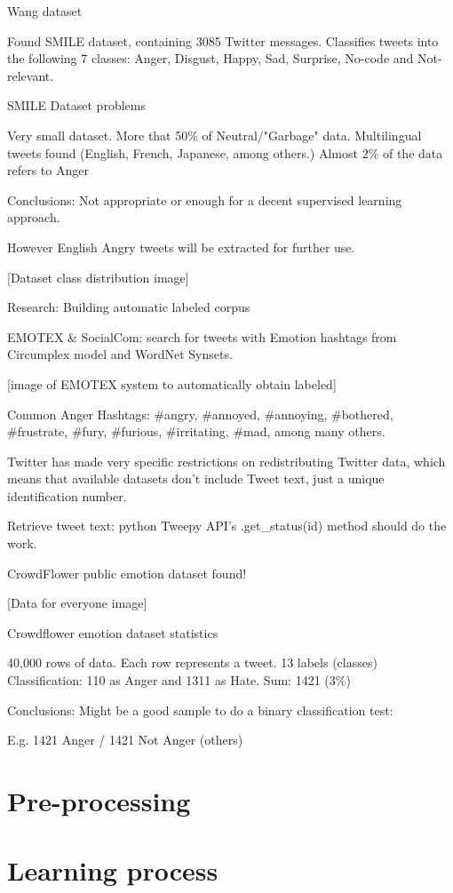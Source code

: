 Wang dataset\cite{wang2012harnessing}

Found SMILE dataset, containing 3085 Twitter messages.
Classifies tweets into the following 7 classes: Anger, Disgust, Happy, Sad, Surprise, No-code and Not-relevant.

SMILE Dataset problems

Very small dataset.
More that 50\% of Neutral/"Garbage" data.
Multilingual tweets found (English, French, Japanese, among others.)
Almost 2\% of the data refers to Anger

Conclusions:
Not appropriate or enough for a decent supervised learning approach.

However English Angry tweets will be extracted for further use.

[Dataset class distribution image]

Research: Building automatic labeled corpus

EMOTEX \& SocialCom: search for tweets with Emotion hashtags from Circumplex model and WordNet Synsets.

[image of EMOTEX system to automatically obtain labeled]

Common Anger Hashtags:
\#angry, \#annoyed, \#annoying, \#bothered, \#frustrate, \#fury, \#furious, \#irritating, \#mad, among many others.

Twitter has made very specific restrictions on redistributing Twitter data, which means that available datasets don't include Tweet text, just a unique identification number.

Retrieve tweet text: python Tweepy\cite{Tweepy} API's .get\_status(id) method should do the work.

CrowdFlower public emotion dataset found!

[Data for everyone image]

Crowdflower emotion dataset statistics

40,000 rows of data.
Each row represents a tweet.
13 labels (classes)
Classification: 110 as Anger and 1311 as Hate. Sum: 1421 (3\%)

Conclusions:
Might be a good sample to do a binary classification test:

E.g. 1421 Anger / 1421 Not Anger (others)

\section{Pre-processing}

\section{Learning process}

